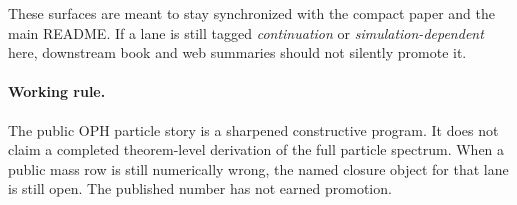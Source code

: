 \documentclass[11pt]{article}
\begin{document}
These surfaces are meant to stay synchronized with the compact paper and the
main README. If a lane is still tagged \emph{continuation} or
\emph{simulation-dependent} here, downstream book and web summaries should not
silently promote it.

\paragraph{Working rule.}
The public OPH particle story is a sharpened constructive program. It does not
claim a completed theorem-level derivation of the full particle spectrum. When
a public mass row is still numerically wrong, the named closure object for that
lane is still open. The published number has not earned promotion.
\end{document}
